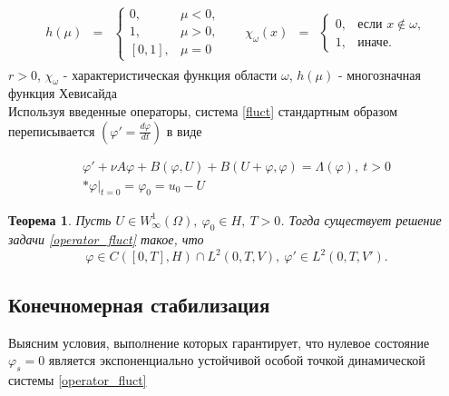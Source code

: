 \begin{gather*}
    \begin{matrix}
        h(\mu) & =
        & \left\{
        \begin{matrix}
            0, & \mu < 0, \\
            1, & \mu > 0, \\
            [0, 1], & \mu = 0
        \end{matrix} \right.
    \end{matrix} \quad
    \begin{matrix}
        \chi_{\omega}(x) & =
        & \left\{
        \begin{matrix}
            0, & \mbox{если } x \notin \omega, \\
            1, & \mbox{иначе. }
        \end{matrix} \right.
    \end{matrix}
\end{gather*}
$r > 0$, $\chi_{\omega}$ - характеристическая функция области $\omega$,
$h(\mu)$ - многозначная функция Хевисайда\\

Используя введенные операторы, система \eqref{fluct} стандартным образом
переписывается $(\varphi' = \frac{d\varphi}{dt})$ в виде

\begin{gather}\label{operator_fluct}
    \varphi' + \nu A\varphi + B(\varphi, U) + B(U + \varphi, \varphi) =
    \Lambda(\varphi), \ t > 0 \\*
    \varphi|_{t = 0} = \varphi_0 = u_0 - U
\end{gather}

\newtheorem{theorem}{Теорема}

\begin{theorem}
    Пусть $U \in W^1_{\infty}(\Omega), \ \varphi_0 \in H, \ T > 0$. 
    Тогда существует решение задачи \eqref{operator_fluct} такое, что
    $$\varphi \in C([0, T], H) \cap L^2(0, T, V), \ \varphi' \in L^2(0, T, V').$$
\end{theorem}

\subsection{Конечномерная стабилизация}
\vspace{1em}

Выясним условия, выполнение которых гарантирует, что нулевое состояние
$\varphi_s = 0$ является экспоненциально устойчивой особой точкой динамической
системы \eqref{operator_fluct}\\

